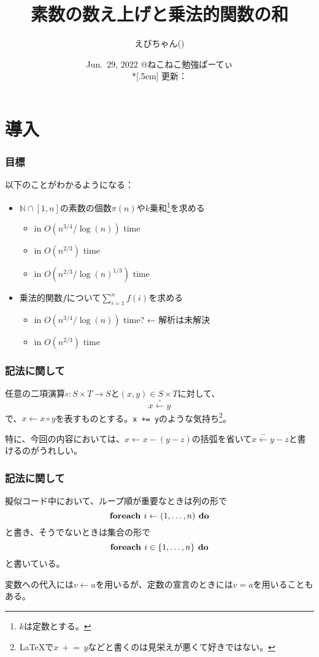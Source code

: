 \documentclass[
  lualatex,
  ja=standard,
  compress,
  hyperref={colorlinks, urlcolor=magenta, linkcolor=blue!55!black},
  dvipsnames,
  svgnames,
]{beamer}
\title{素数の数え上げと乗法的関数の和}
\author[えびちゃん]{えびちゃん(\hspace{.05em}\textcolor{useryellow}{\lato{\textbf{rsk0315}}}\hspace{.05em})}
\date{Jun.~29, 2022 @ねこねこ勉強ぱーてぃ\\*[.5em]
  {\footnotesize 更新：}\directlua{commit_hash_and_date("\jobname.tex")}}
\newcommand{\xgets}[1]{\xleftarrow{#1}}
\begin{document}
\begin{frame}
  \maketitle
\end{frame}

\section{導入}
\begin{frame}
  \frametitle{目標}

  以下のことがわかるようになる：
  \begin{itemize}
  \item $\mathbb{N}\cap[1, n]$の素数の個数$\pi(n)$や$k$乗和\footnote{$k$は定数とする。}を求める
    \begin{itemize}
    \item in $O(n^{3/4}/\log(n))$ time
    \item in $O(n^{2/3})$ time
    \item in $O(n^{2/3} / \log(n)^{1/3})$ time
    \end{itemize}
  \item 乗法的関数$f$について$\sum_{i=1}^n f(i)$を求める
    \begin{itemize}
    \item in $O(n^{3/4}/\log(n))$ time? ← 解析は未解決
    \item in $O(n^{2/3})$ time
    \end{itemize}
  \end{itemize}
\end{frame}

\setcounter{slidetopic}{0}
\begin{frame}
  \frametitle{記法に関して \theslidetopic}

  任意の二項演算$\circ: S\times T\to S$と$(x, y)\in S\times T$に対して、
  $$ x\xgets{\circ} y $$
  で、$x\gets x\circ y$を表すものとする。\texttt{x += y}のような気持ち\footnote{\LaTeX{}で$x\:+\!\!=\,y$などと書くのは見栄えが悪くて好きではない。}。

  特に、今回の内容においては、$x \gets x - (y - z)$の括弧を省いて$x \xgets{-} y-z$と書けるのがうれしい。

\end{frame}

\begin{frame}
  \frametitle{記法に関して \theslidetopic}

  擬似コード中において、ループ順が重要なときは列の形で
  $$ \text{\textbf{foreach }}i\gets(1, \dots, n)\text{\textbf{ do}} $$
  と書き、そうでないときは集合の形で
  $$ \text{\textbf{foreach }}i\in\{1, \dots, n\}\text{\textbf{ do}} $$
  と書いている。

  変数への代入には$v \gets a$を用いるが、定数の宣言のときには$v=a$を用いることもある。
\end{frame}
\end{document}
